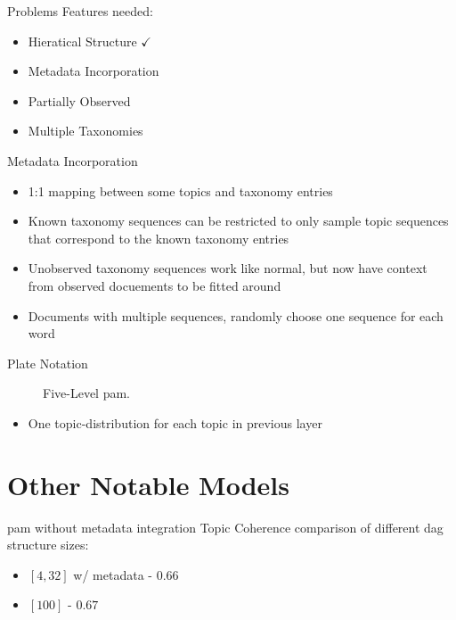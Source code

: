 \begin{frame}{\insertsection}{Problems}
	Features needed:
	\begin{itemize}
		\item Hieratical Structure $\checkmark$
		\item Metadata Incorporation
		\item Partially Observed
		\item Multiple Taxonomies
	\end{itemize}
\end{frame}

\begin{frame}{\insertsection}{Metadata Incorporation}
	\begin{itemize}
		\item<1-> 1:1 mapping between some topics and taxonomy entries
		\only<2>{\newline}
		\item<3-> Known taxonomy sequences can be restricted to only sample topic sequences that correspond to the known taxonomy entries
		\item<4-> Unobserved taxonomy sequences work like normal, but now have context from observed docuements to be fitted around
		\item<5-> Documents with multiple sequences, randomly choose one sequence for each word
	\end{itemize}
\end{frame}

\begin{frame}{\insertsection}{Plate Notation}
	\begin{figure}
		\centering
		\resizebox{0.5\columnwidth}{!}{%
			
		}
		\caption{Five-Level \gls{pam}.}
	\end{figure}

	\begin{itemize}
		\item One topic-distribution for each topic in previous layer
	\end{itemize}
\end{frame}

\section{Other Notable Models}

\begin{frame}{\insertsection}{\gls{pam} without metadata integration}
	Topic Coherence comparison of different \gls{dag} structure sizes:
	\begin{itemize}
		\item $[4, 32]$ w/ metadata - $0.66$
		\item $[100]$ - $0.67$
	\end{itemize}
\end{frame}


